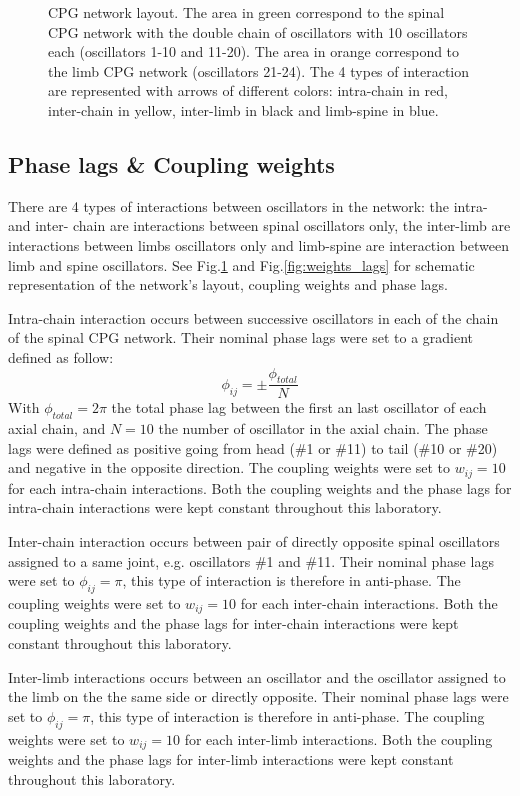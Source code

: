 \documentclass[a4paper]{scrartcl}
\begin{document}
{\begin{figure}
 \caption{\label{fig:CPG_layout} CPG network layout. The area in green correspond to the spinal CPG network with the double chain of oscillators with 10 oscillators each (oscillators 1-10 and 11-20). The area in orange correspond to the limb CPG network (oscillators 21-24). The 4 types of interaction are represented with arrows of different colors: intra-chain in red, inter-chain in yellow, inter-limb in black and limb-spine in blue.}
\end{figure}

\subsection*{Phase lags \& Coupling weights}
There are 4 types of interactions between oscillators in the network: the intra- and inter- chain are interactions between spinal oscillators only, the inter-limb are interactions between limbs oscillators only and limb-spine are interaction between limb and spine oscillators. See Fig.\ref{fig:CPG_layout} and Fig.\ref{fig:weights_lags} for schematic representation of the network's layout, coupling weights and phase lags. 

Intra-chain interaction occurs between successive oscillators in each of the chain of the spinal CPG network. Their nominal phase lags were set to a gradient defined as follow:
\begin{equation}
 \phi_{ij} = \pm \frac{\phi_{total}}{N}
\end{equation}
With $\phi_{total} = 2\pi$ the total phase lag between the first an last oscillator of each axial chain, and $N = 10$ the number of oscillator in the axial chain. The phase lags were defined as positive going from head (\#1 or \#11) to tail (\#10 or \#20) and negative in the opposite direction. The coupling weights were set to $w_{ij} = 10$ for each intra-chain interactions. Both the coupling weights and the phase lags for intra-chain interactions were kept constant throughout this laboratory.

Inter-chain interaction occurs between pair of directly opposite spinal oscillators assigned to a same joint, e.g. oscillators \#1 and \#11. Their nominal phase lags were set to $\phi_{ij} = \pi$, this type of interaction is therefore in anti-phase. The coupling weights were set to $w_{ij} = 10$ for each inter-chain interactions. Both the coupling weights and the phase lags for inter-chain interactions were kept constant throughout this laboratory.

Inter-limb interactions occurs between an oscillator and the oscillator assigned to the limb on the the same side or directly opposite. Their nominal phase lags were set to $\phi_{ij} = \pi$, this type of interaction is therefore in anti-phase. The coupling weights were set to $w_{ij} = 10$ for each inter-limb interactions. Both the coupling weights and the phase lags for inter-limb interactions were kept constant throughout this laboratory.

}
\end{document}
